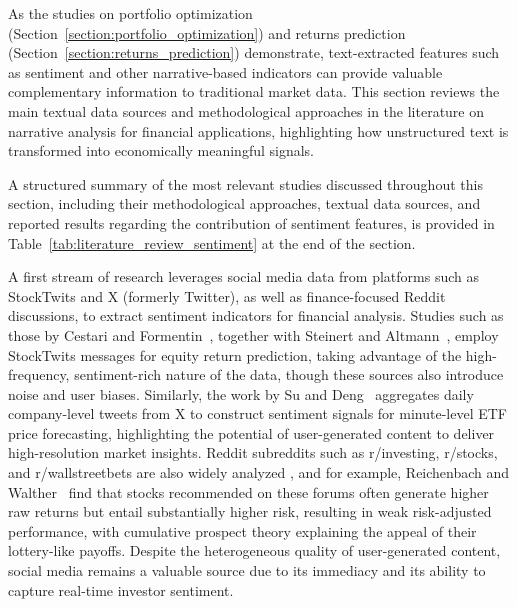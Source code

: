 As the studies on portfolio optimization (Section~\ref{section:portfolio_optimization}) and returns prediction (Section~\ref{section:returns_prediction}) demonstrate, text-extracted features such as sentiment and other narrative-based indicators can provide valuable complementary information to traditional market data. This section reviews the main textual data sources and methodological approaches in the literature on narrative analysis for financial applications, highlighting how unstructured text is transformed into economically meaningful signals.

A structured summary of the most relevant studies discussed throughout this section, including their methodological approaches, textual data sources, and reported results  regarding the contribution of sentiment features, is provided in Table~\ref{tab:literature_review_sentiment} at the end of the section.

A first stream of research leverages social media data from platforms such as StockTwits and X (formerly Twitter), as well as finance-focused Reddit discussions, to extract sentiment indicators for financial analysis.
Studies such as those by Cestari and Formentin~\cite{d892a}, together with Steinert and Altmann~\cite{a12be}, employ StockTwits messages for equity return prediction, taking advantage of the high-frequency, sentiment-rich nature of the data, though these sources also introduce noise and user biases.
Similarly, the work by Su and Deng~\cite{34309} aggregates daily company-level tweets from X to construct sentiment signals for minute-level ETF price forecasting, highlighting the potential of user-generated content to deliver high-resolution market insights.
Reddit subreddits such as r/investing, r/stocks, and r/wallstreetbets are also widely analyzed \cite{5530e, cc28c, da676}, and for example, Reichenbach and Walther~\cite{cc28c} find that stocks recommended on these forums often generate higher raw returns but entail substantially higher risk, resulting in weak risk-adjusted performance, with cumulative prospect theory explaining the appeal of their lottery-like payoffs.
Despite the heterogeneous quality of user-generated content, social media remains a valuable source due to its immediacy and its ability to capture real-time investor sentiment.

